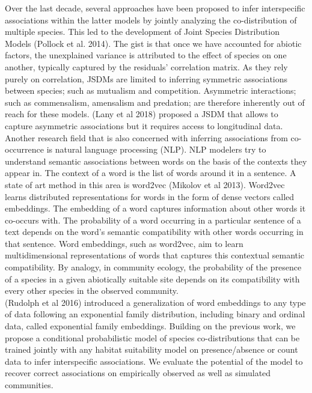 \documentclass[]{article}
\begin{document}
\noindent Over the last decade, several approaches have been proposed to infer interspecific associations within the latter models by jointly analyzing the co-distribution of multiple species. This led to the development of Joint Species Distribution Models (Pollock et al. 2014). The gist is that once we have accounted for abiotic factors, the unexplained variance is attributed to the effect of species on one another, typically captured by the residuals' correlation matrix. As they rely purely on correlation, JSDMs are limited to inferring symmetric associations between species; such as mutualism and competition. Asymmetric interactions; such as commensalism, amensalism and predation; are therefore inherently out of reach for these models. (Lany et al 2018) proposed a JSDM that allows to capture asymmetric associations but it requires access to longitudinal data. \\

\noindent Another research field that is also concerned with inferring associations from co-occurrence is natural language processing (NLP). NLP modelers try to understand semantic associations between words on the basis of the contexts they appear in. The context of a word is the list of words around it in a sentence. A state of art method in this area is word2vec (Mikolov et al 2013). Word2vec learns distributed representations for words in the form of dense vectors called embeddings. The embedding of a word captures information about other words it co-occurs with. The probability of a word occurring in a particular sentence of a text depends on the word's semantic compatibility with other words occurring in that sentence. Word embeddings, such as word2vec, aim to learn multidimensional representations of words that captures this contextual semantic compatibility. By analogy, in community ecology, the probability of the presence of a species in a given abiotically suitable site depends on its compatibility with every other species in the observed community. \\

\noindent (Rudolph et al 2016) introduced a generalization of word embeddings to any type of data following an exponential family distribution, including binary and ordinal data, called exponential family embeddings. Building on the previous work, we propose a conditional probabilistic model of species co-distributions that can be trained jointly with any habitat suitability model on presence/absence or count data to infer interspecific associations. We evaluate the potential of the model to recover correct associations on empirically observed as well as simulated communities.
\end{document}
